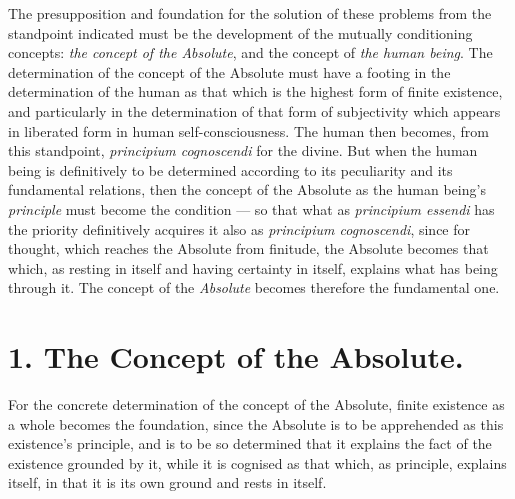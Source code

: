 \documentclass[12pt,a4paper]{book}
\begin{document}
The presupposition and foundation for the solution of these problems from the
standpoint indicated must be the development of the mutually conditioning
concepts: \emph{the concept of the Absolute}, and the concept of \emph{the
human being}. The determination of the concept of the Absolute must have a
footing in the determination of the human as that which is the highest form of
finite existence, and particularly in the determination of that form of
subjectivity which appears in liberated form in human self-consciousness. The
human then becomes, from this standpoint, \textit{principium cognoscendi} for
the divine. But when the human being is definitively to be determined
according to its peculiarity and its fundamental relations, then the concept
of the Absolute as the human being's \emph{principle} must become the
condition --- so that what as \textit{principium essendi} has the priority
definitively acquires it also as \textit{principium cognoscendi}, since for
thought, which reaches the Absolute from finitude, the Absolute becomes that
which, as resting in itself and having certainty in itself, explains what has
being through it. The concept of the \emph{Absolute} becomes therefore the
fundamental one.

\section*{1. The Concept of the Absolute.}

For the concrete determination of the concept of the Absolute, finite
existence as a whole becomes the foundation, since
the Absolute is to be apprehended as this existence's principle, and is to be
so determined that it explains the fact of the existence grounded by it, while
it is cognised as that which, as principle, explains itself, in that it is its
own ground and rests in itself.
\end{document}
